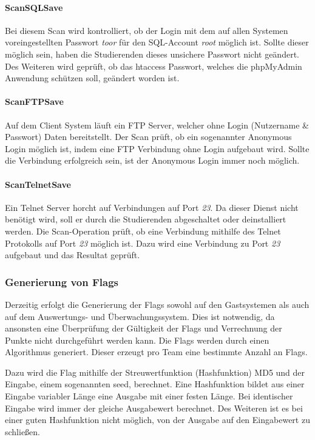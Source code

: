 \paragraph{ScanSQLSave}\label{para:ScanSQLSave}
Bei diesem Scan wird kontrolliert, ob der Login mit dem auf allen Systemen voreingestellten Passwort \textit{toor} für den SQL-Account \textit{root} möglich ist. Sollte dieser möglich sein, haben die Studierenden dieses unsichere Passwort nicht geändert. Des Weiteren wird geprüft, ob das htaccess Passwort, welches die phpMyAdmin Anwendung schützen soll, geändert worden ist.

\paragraph{ScanFTPSave}\label{para:ScanFTPSave}
Auf dem Client System läuft ein FTP Server, welcher ohne Login (Nutzername \& Passwort) Daten bereitstellt. Der Scan prüft, ob ein sogenannter Anonymous Login möglich ist, indem eine FTP Verbindung ohne Login aufgebaut wird. Sollte die Verbindung erfolgreich sein, ist der Anonymous Login immer noch möglich.

\paragraph{ScanTelnetSave}\label{para:ScanTelnetSave}
Ein Telnet Server horcht auf Verbindungen auf Port \textit{23}. Da dieser Dienst nicht benötigt wird, soll er durch die Studierenden abgeschaltet oder deinstalliert werden. Die Scan-Operation prüft, ob eine Verbindung mithilfe des Telnet Protokolls auf Port \textit{23} möglich ist. Dazu wird eine Verbindung zu Port \textit{23} aufgebaut und das Resultat geprüft.

\subsubsection{Generierung von Flags}\label{subsubsec:Generierung_von_Flags}

Derzeitig erfolgt die Generierung der Flags sowohl auf den Gastsystemen als auch auf dem Auswertungs- und Überwachungssystem. Dies ist notwendig, da ansonsten eine Überprüfung der Gültigkeit der Flags und Verrechnung der Punkte nicht durchgeführt werden kann. Die Flags werden durch einen Algorithmus generiert. Dieser erzeugt pro Team eine bestimmte Anzahl an Flags. 

Dazu wird die Flag mithilfe der Streuwertfunktion (Hashfunktion) MD5 und der Eingabe, einem sogenannten seed, berechnet. Eine Hashfunktion bildet aus einer Eingabe variabler Länge eine Ausgabe mit einer festen Länge. Bei identischer Eingabe wird immer der gleiche Ausgabewert berechnet. Des Weiteren ist es bei einer guten Hashfunktion nicht möglich, von der Ausgabe auf den Eingabewert zu schließen. \cite{menezesHandbookAppliedCryptography1996}

